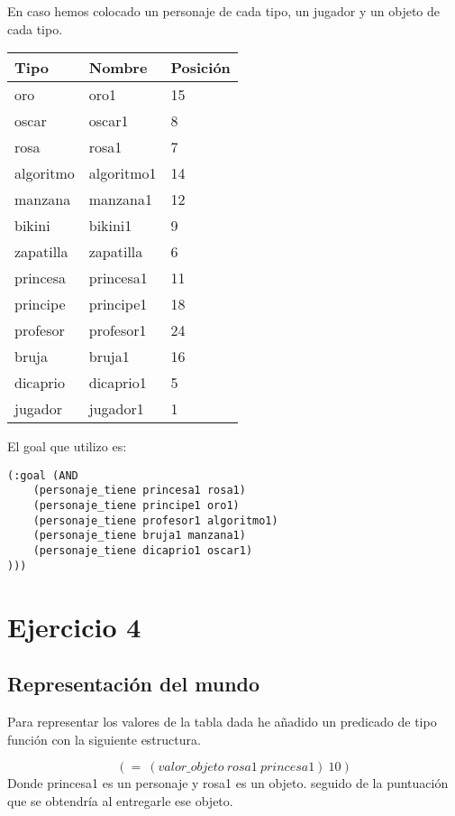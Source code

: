 \documentclass[]{article}
\begin{document}
En caso hemos colocado un personaje de cada tipo, un jugador y un objeto de cada tipo.

\begin{table}[H]
	\begin{center}
		\begin{tabular}{|l|l|l|}
			\hline
			Tipo & Nombre & Posición \\
			\hline \hline
			oro & oro1 & 15 \\ \hline
			oscar & oscar1 & 8\\ \hline
			rosa & rosa1 & 7\\ \hline
			algoritmo & algoritmo1 & 14 \\ \hline
			manzana & manzana1 & 12\\ \hline
			bikini & bikini1 & 9\\ \hline
			zapatilla & zapatilla & 6\\ \hline 
			princesa & princesa1 & 11 \\ \hline
			principe & principe1 & 18 \\ \hline
			profesor & profesor1 & 24  \\ \hline
			bruja & bruja1 & 16 \\ \hline
			dicaprio  & dicaprio1& 5 \\ \hline
			jugador & jugador1 & 1 \\ \hline
			
		\end{tabular}
	\end{center}
\end{table}

El goal que utilizo es:
\begin{lstlisting}
(:goal (AND
	(personaje_tiene princesa1 rosa1)
	(personaje_tiene principe1 oro1)
	(personaje_tiene profesor1 algoritmo1)
	(personaje_tiene bruja1 manzana1)
	(personaje_tiene dicaprio1 oscar1)
)))
\end{lstlisting}
\section{Ejercicio 4}
\subsection{Representación del mundo}
Para representar los valores de la tabla dada he añadido un predicado de tipo función con la siguiente estructura.


$$
(=\ (valor\_objeto\ rosa1\ princesa1)\ 10)
$$
Donde princesa1 es un personaje y rosa1 es un objeto. seguido de la puntuación que se obtendría al entregarle ese objeto.
\end{document}
